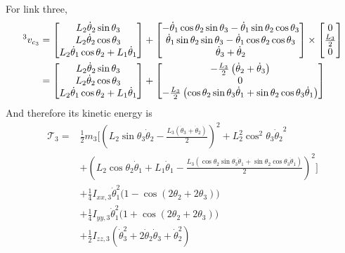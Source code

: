 \documentclass{article}
\begin{document}
For link three,
\[
    \begin{aligned}
        \prescript{3}{}{v_{c_3}} & = \begin{bmatrix}
            {L_2} \dot\theta_2 \sin\theta_3\\
                {L_2} \dot\theta_2 \cos\theta_3\\
                {L_2} \dot\theta_1 \cos\theta_2 + L_1 \dot \theta_1
        \end{bmatrix} + \begin{bmatrix}
            -\dot\theta_1 \cos\theta_2 \sin\theta_3 -\dot\theta_1 \sin\theta_2 \cos\theta_3\\
            \dot\theta_1 \sin\theta_2 \sin\theta_3 - \dot\theta_1 \cos\theta_2 \cos\theta_3\\
            \dot\theta_3 + \dot\theta_2
        \end{bmatrix} \times \begin{bmatrix}
            0 \\ \frac{L_3}{2} \\ 0 \\
        \end{bmatrix} \\
        & = \begin{bmatrix}
            {L_2} \dot\theta_2 \sin\theta_3\\
                {L_2} \dot\theta_2 \cos\theta_3\\
                {L_2} \dot\theta_1 \cos\theta_2 + L_1 \dot \theta_1
        \end{bmatrix} + \begin{bmatrix}
            - \frac{L_3}{2} \left( \dot \theta_2 + \dot \theta_3\right) \\
            0 \\
            - \frac{{L_3}}{2}  \left( \cos\theta_2 \sin\theta_3 \dot\theta_1 + \sin\theta_2 \cos\theta_3 \dot\theta_1 \right)
        \end{bmatrix}
    \end{aligned}
\]
And therefore its kinetic energy is
\[
    \begin{aligned}
        \mathcal T_3 = & \frac{1}{2} m_3 \Big[ {{\left( {L_2} \sin\theta_3 \dot\theta_2-\frac{{L_3} \left( \dot\theta_3+\dot\theta_2\right) }{2}\right) }^{2}}+ L_2^2 {{\cos^2\theta_3}} {{\dot\theta_2}^{2}} \\
        &+ {{\left( {L_2} \cos\theta_2 \dot\theta_1 + L_1 \dot \theta_1 -\frac{{L_3} \left( \cos\theta_2 \sin\theta_3 \dot\theta_1+\sin\theta_2 \cos\theta_3 \dot\theta_1\right) }{2}\right) }^{2}} \Big] \\
        &+ \frac{1}{4} I_{xx,3} \dot\theta_1^2 \big( 1 - \cos(2\theta_2 + 2\theta_3) \big) \\
        &+ \frac{1}{4} I_{yy,3} \dot\theta_1^2 \big( 1 + \cos(2\theta_2 + 2\theta_3) \big) \\
        &+ \frac{1}{2} I_{zz,3} (\dot\theta_3^2 + 2 \dot\theta_2 \dot\theta_3 + \dot\theta_2^2)
    \end{aligned}
\]
\end{document}
